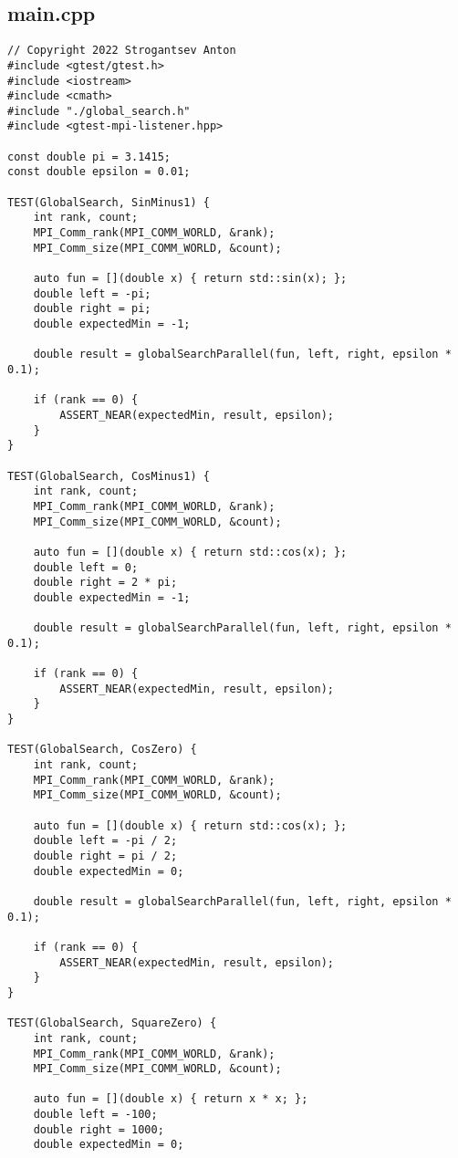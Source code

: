 \documentclass[14pt, a4paper]{extarticle}
\begin{document}
	\subsection{main.cpp}
	\begin{lstlisting}
// Copyright 2022 Strogantsev Anton
#include <gtest/gtest.h>
#include <iostream>
#include <cmath>
#include "./global_search.h"
#include <gtest-mpi-listener.hpp>

const double pi = 3.1415;
const double epsilon = 0.01;

TEST(GlobalSearch, SinMinus1) {
    int rank, count;
    MPI_Comm_rank(MPI_COMM_WORLD, &rank);
    MPI_Comm_size(MPI_COMM_WORLD, &count);

    auto fun = [](double x) { return std::sin(x); };
    double left = -pi;
    double right = pi;
    double expectedMin = -1;

    double result = globalSearchParallel(fun, left, right, epsilon * 0.1);

    if (rank == 0) {
        ASSERT_NEAR(expectedMin, result, epsilon);
    }
}

TEST(GlobalSearch, CosMinus1) {
    int rank, count;
    MPI_Comm_rank(MPI_COMM_WORLD, &rank);
    MPI_Comm_size(MPI_COMM_WORLD, &count);

    auto fun = [](double x) { return std::cos(x); };
    double left = 0;
    double right = 2 * pi;
    double expectedMin = -1;

    double result = globalSearchParallel(fun, left, right, epsilon * 0.1);

    if (rank == 0) {
        ASSERT_NEAR(expectedMin, result, epsilon);
    }
}

TEST(GlobalSearch, CosZero) {
    int rank, count;
    MPI_Comm_rank(MPI_COMM_WORLD, &rank);
    MPI_Comm_size(MPI_COMM_WORLD, &count);

    auto fun = [](double x) { return std::cos(x); };
    double left = -pi / 2;
    double right = pi / 2;
    double expectedMin = 0;

    double result = globalSearchParallel(fun, left, right, epsilon * 0.1);

    if (rank == 0) {
        ASSERT_NEAR(expectedMin, result, epsilon);
    }
}

TEST(GlobalSearch, SquareZero) {
    int rank, count;
    MPI_Comm_rank(MPI_COMM_WORLD, &rank);
    MPI_Comm_size(MPI_COMM_WORLD, &count);

    auto fun = [](double x) { return x * x; };
    double left = -100;
    double right = 1000;
    double expectedMin = 0;


\end{lstlisting}
\end{document}
